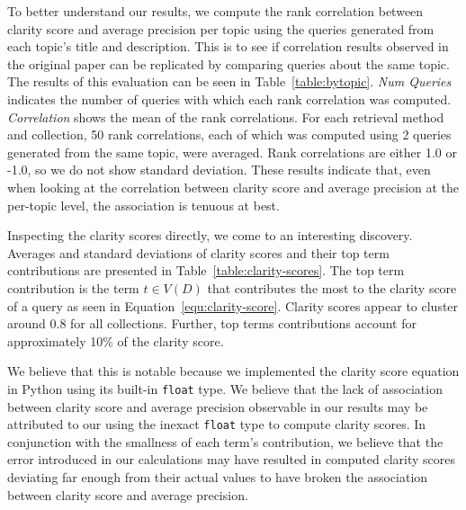 \documentclass[format=sigconf, screen=true, review=false]{acmart}
\newcommand{\inlinecode}[1]{\texttt{#1}}
\begin{document}


To better understand our results, we compute the rank correlation between clarity score and average precision per topic using the queries generated from each topic's title and description.
This is to see if correlation results observed in the original paper can be replicated by comparing queries about the same topic. %
The results of this evaluation can be seen in Table~\ref{table:bytopic}.
\textit{Num Queries} indicates the number of queries with which each rank correlation was computed.
\textit{Correlation} shows the mean of the rank correlations.
For each retrieval method and collection, 50 rank correlations, each of which was computed using 2 queries generated from the same topic, were averaged.
Rank correlations are either 1.0 or -1.0, so we do not show standard deviation.
These results indicate that, even when looking at the correlation between clarity score and average precision at the per-topic level, the association is tenuous at best.



Inspecting the clarity scores directly, we come to an interesting discovery.
Averages and standard deviations of clarity scores and their top term contributions are presented in Table~\ref{table:clarity-scores}.
The top term contribution is the term $t \in V(D)$ that contributes the most to the clarity score of a query as seen in Equation~\ref{equ:clarity-score}.
Clarity scores appear to cluster around 0.8 for all collections.
Further, top terms contributions account for approximately 10\% of the clarity score.

We believe that this is notable because we implemented the clarity score equation in Python using its built-in \inlinecode{float} type.
We believe that the lack of association between clarity score and average precision observable in our results may be attributed to our using the inexact \inlinecode{float} type to compute clarity scores.
In conjunction with the smallness of each term's contribution, we believe that the error introduced in our calculations may have resulted in computed clarity scores deviating far enough from their actual values to have broken the association between clarity score and average precision.
\end{document}
